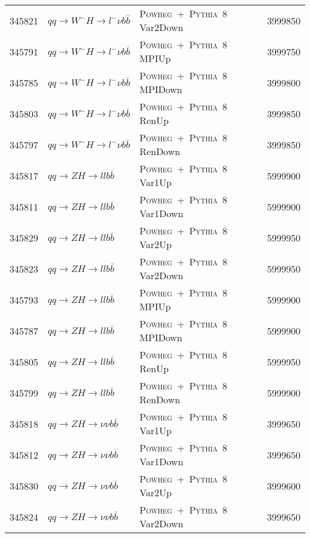 \begin{table}[hb]
{\begin{tabular}{rllr}
      345821 & $qq\to W^{-}H \to l^{-}\nu b\bar{b}$         & \textsc{Powheg}~+~\textsc{Pythia}~8  Var2Down & 3999850 \\
      345791 & $qq\to W^{-}H \to l^{-}\nu b\bar{b}$         & \textsc{Powheg}~+~\textsc{Pythia}~8  MPIUp & 3999750 \\
      345785 & $qq\to W^{-}H \to l^{-}\nu b\bar{b}$         & \textsc{Powheg}~+~\textsc{Pythia}~8  MPIDown & 3999800 \\
      345803 & $qq\to W^{-}H \to l^{-}\nu b\bar{b}$         & \textsc{Powheg}~+~\textsc{Pythia}~8  RenUp & 3999850 \\
      345797 & $qq\to W^{-}H \to l^{-}\nu b\bar{b}$         & \textsc{Powheg}~+~\textsc{Pythia}~8  RenDown & 3999850 \\
      345817 & $qq\to ZH \to ll b\bar{b}$                   & \textsc{Powheg}~+~\textsc{Pythia}~8  Var1Up & 5999900 \\
      345811 & $qq\to ZH \to ll b\bar{b}$                   & \textsc{Powheg}~+~\textsc{Pythia}~8  Var1Down & 5999900 \\
      345829 & $qq\to ZH \to ll b\bar{b}$                   & \textsc{Powheg}~+~\textsc{Pythia}~8  Var2Up & 5999950 \\
      345823 & $qq\to ZH \to ll b\bar{b}$                   & \textsc{Powheg}~+~\textsc{Pythia}~8  Var2Down & 5999950 \\
      345793 & $qq\to ZH \to ll b\bar{b}$                   & \textsc{Powheg}~+~\textsc{Pythia}~8  MPIUp & 5999900 \\
      345787 & $qq\to ZH \to ll b\bar{b}$                   & \textsc{Powheg}~+~\textsc{Pythia}~8  MPIDown & 5999900 \\
      345805 & $qq\to ZH \to ll b\bar{b}$                   & \textsc{Powheg}~+~\textsc{Pythia}~8  RenUp & 5999950 \\
      345799 & $qq\to ZH \to ll b\bar{b}$                   & \textsc{Powheg}~+~\textsc{Pythia}~8  RenDown & 5999900 \\
      345818 & $qq\to ZH \to \nu\nu b\bar{b}$  & \textsc{Powheg}~+~\textsc{Pythia}~8  Var1Up & 3999650 \\
      345812 & $qq\to ZH \to \nu\nu b\bar{b}$  & \textsc{Powheg}~+~\textsc{Pythia}~8  Var1Down & 3999650 \\
      345830 & $qq\to ZH \to \nu\nu b\bar{b}$  & \textsc{Powheg}~+~\textsc{Pythia}~8  Var2Up & 3999600 \\
      345824 & $qq\to ZH \to \nu\nu b\bar{b}$  & \textsc{Powheg}~+~\textsc{Pythia}~8  Var2Down & 3999650 \\

\end{tabular}}
\end{table}
